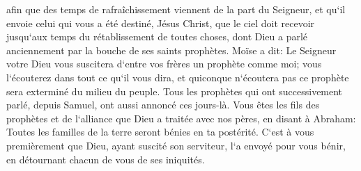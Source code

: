 \verse afin que des temps de rafraîchissement viennent de la part du Seigneur, et qu`il envoie celui qui vous a été destiné, Jésus Christ, 
\verse que le ciel doit recevoir jusqu`aux temps du rétablissement de toutes choses, dont Dieu a parlé anciennement par la bouche de ses saints prophètes. 
\verse Moïse a dit: Le Seigneur votre Dieu vous suscitera d`entre vos frères un prophète comme moi; vous l`écouterez dans tout ce qu`il vous dira, 
\verse et quiconque n`écoutera pas ce prophète sera exterminé du milieu du peuple. 
\verse Tous les prophètes qui ont successivement parlé, depuis Samuel, ont aussi annoncé ces jours-là. 
\verse Vous êtes les fils des prophètes et de l`alliance que Dieu a traitée avec nos pères, en disant à Abraham: Toutes les familles de la terre seront bénies en ta postérité. 
\verse C`est à vous premièrement que Dieu, ayant suscité son serviteur, l`a envoyé pour vous bénir, en détournant chacun de vous de ses iniquités. 

